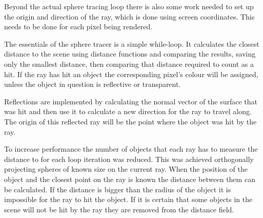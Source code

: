 			Beyond the actual sphere tracing loop there is also some work 
			needed to set up the origin and direction of the ray, which is done using 
			screen coordinates. This needs to be done for each pixel being 
			rendered.

			The essentials of the sphere tracer is a simple while-loop. It 
			calculates the closest distance to the scene using distance functions 
			and comparing the results, saving only the smallest distance, then 
			comparing that distance required to count as a hit. If the ray has hit 
			an object the corresponding pixel's colour will be assigned, unless the 
			object in question is reflective or transparent. 

			Reflections are implemented by calculating the normal vector of the surface 
			that was hit and then use it to calculate a new direction 
			for the ray to travel along. The origin of this reflected ray will be 
			the point where the object was hit by the ray.

			To increase performance the number of objects that each ray has to 
			measure the distance to for each loop iteration was reduced. This 
			was achieved orthogonally projecting spheres of known size on the
			current ray. When the position of the object and the closest point 
			on the ray is known the distance between them can be calculated. If
			the distance is bigger than the radius of the object it is impossible
			for the ray to hit the object. If it is certain that some objects in 
			the scene will not be hit by the ray they are removed from the 
			distance field.


			

	
		\subsection{}
